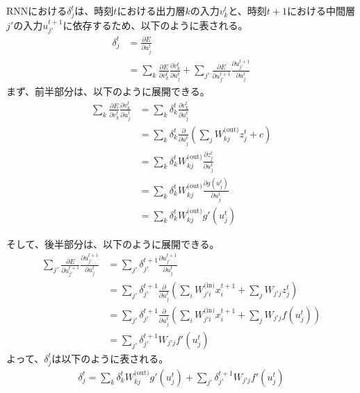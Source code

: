 \documentclass{ltjsarticle}
\begin{document}
RNNにおける$\delta_j^t$は、時刻$t$における出力層$k$の入力$v_k^t$と、時刻$t+1$における中間層$j'$の入力$u_{j'}^{t+1}$に依存するため、以下のように表される。
\begin{align}
  \delta_j^t &= \frac{\partial E}{\partial u_j^t}\\
   &= \sum_k \frac{\partial E}{\partial v_k^t} \frac{\partial v_k^t}{\partial u_j^t} + \sum_{j'} \frac{\partial E}{\partial u_{j'}^{t+1}} \frac{\partial u_{j'}^{t+1}}{\partial u_j^t}
\end{align}
まず、前半部分は、以下のように展開できる。
\begin{align}
  \sum_k \frac{\partial E}{\partial v_k^t} \frac{\partial v_k^t}{\partial u_j^t} &= \sum_k \delta_k^t \frac{\partial v_k^t}{\partial u_j^t}\\
  &= \sum_k \delta_k^t \frac{\partial}{\partial u_j^t} \left( \sum_{j} W_{kj}^{\text{(out)}}z_{j}^t + c \right)\\
  &= \sum_k \delta_k^t W_{kj}^{\text{(out)}} \frac{\partial z_j^t}{\partial u_j^t}\\
  &= \sum_k \delta_k^t W_{kj}^{\text{(out)}} \frac{\partial g(u_j^t)}{\partial u_j^t}\\
  &= \sum_k \delta_k^t W_{kj}^{\text{(out)}} g'(u_j^t)
\end{align}

そして、後半部分は、以下のように展開できる。
\begin{align}
  \sum_{j'} \frac{\partial E}{\partial u_{j'}^{t+1}} \frac{\partial u_{j'}^{t+1}}{\partial u_j^t} &= \sum_{j'} \delta_{j'}^{t+1} \frac{\partial u_{j'}^{t+1}}{\partial u_j^t}\\
  &= \sum_{j'} \delta_{j'}^{t+1} \frac{\partial}{\partial u_j^t} \left( \sum_i W_{j'i}^{\text{(in)}}x_i^{t+1} + \sum_{j} W_{j'j}z_{j}^t \right)\\
  &= \sum_{j'} \delta_{j'}^{t+1} \frac{\partial}{\partial u_j^t} \left( \sum_i W_{j'i}^{\text{(in)}}x_i^{t+1} + \sum_{j} W_{j'j}f(u_j^t) \right)\\
  &= \sum_{j'} \delta_{j'}^{t+1} W_{j'j} f'(u_j^t)
\end{align}
よって、$\delta_j^t$は以下のように表される。
\begin{align}
  \delta_j^t =  \sum_k \delta_k^t W_{kj}^{\text{(out)}} g'(u_j^t) + \sum_{j'} \delta_{j'}^{t+1} W_{j'j} f'(u_j^t)
\end{align}
\end{document}
